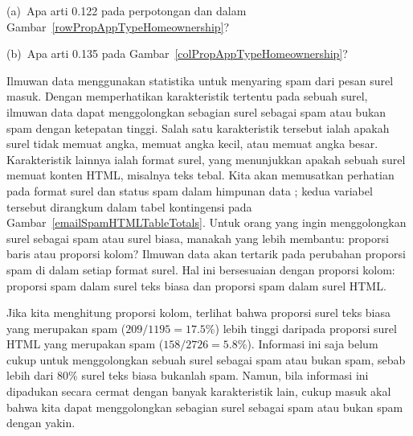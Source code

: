 \begin{exercisewrap}
\begin{nexercise}
(a)~Apa arti 0.122 pada perpotongan  dan
 dalam
Gambar~\ref{rowPropAppTypeHomeownership}?

(b)~Apa arti 0.135 pada
Gambar~\ref{colPropAppTypeHomeownership}?\footnotemark{}
\end{nexercise}
\end{exercisewrap}

\begin{examplewrap}
\begin{nexample}{
    Ilmuwan data menggunakan statistika untuk menyaring spam dari
    pesan surel masuk.
    Dengan memperhatikan karakteristik tertentu pada sebuah surel,
    ilmuwan data dapat menggolongkan sebagian surel sebagai spam
    atau bukan spam dengan ketepatan tinggi.
    Salah satu karakteristik tersebut ialah apakah surel
    tidak memuat angka, memuat angka kecil, atau memuat angka besar.
    Karakteristik lainnya ialah format surel, yang menunjukkan
    apakah sebuah surel memuat konten HTML,
    misalnya teks tebal.
    Kita akan memusatkan perhatian pada format surel dan status spam
    dalam himpunan data ; kedua variabel tersebut dirangkum
    dalam tabel kontingensi pada
    Gambar~\ref{emailSpamHTMLTableTotals}.
    Untuk orang yang ingin menggolongkan surel sebagai spam atau surel biasa,
    manakah yang lebih membantu: proporsi baris atau proporsi kolom?}
  \label{weighingRowColumnProportions}
  Ilmuwan data akan tertarik pada perubahan proporsi spam
  di dalam setiap format surel.
  Hal ini bersesuaian dengan proporsi kolom:
  proporsi spam dalam surel teks biasa
  dan proporsi spam dalam surel HTML.

  Jika kita menghitung proporsi kolom, terlihat bahwa
  proporsi surel teks biasa yang merupakan spam
  ($209/1195 = 17.5\%$) lebih tinggi daripada
  proporsi surel HTML yang merupakan spam ($158/2726 = 5.8\%$).
  Informasi ini saja belum cukup untuk menggolongkan sebuah surel
  sebagai spam atau bukan spam, sebab lebih dari 80\% surel teks biasa
  bukanlah spam.
  Namun, bila informasi ini dipadukan secara cermat dengan banyak
  karakteristik lain,
  cukup masuk akal bahwa kita dapat menggolongkan
  sebagian surel sebagai spam atau bukan spam dengan yakin.
\end{nexample}
\end{examplewrap}

